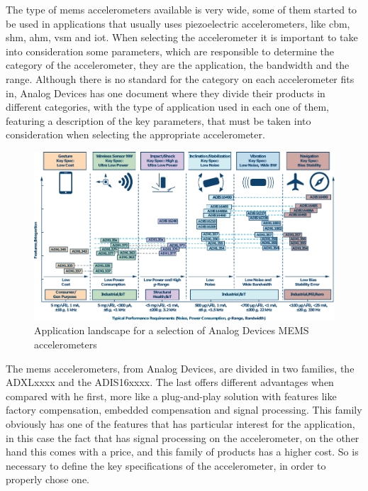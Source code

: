 The type of \acrshort{mems} accelerometers available is very wide, some of them started to be used in applications that usually uses piezoelectric accelerometers, like \acrshort{cbm}, \acrshort{shm}, \acrshort{ahm}, \acrshort{vsm} and \acrshort{iot}. When selecting the accelerometer it is important to take into consideration some parameters, which are responsible to determine the category of the accelerometer, they are the application, the bandwidth and the range. Although there is no standard for the category on each accelerometer fits in, Analog Devices has one document where they divide their products in different categories, with the type of application used in each one of them, featuring a description of the key parameters, that must be taken into consideration when selecting the appropriate accelerometer.
\begin{figure}[]
    \centering
    \includegraphics[width=1\textwidth]{Chapters/4CHP/Figures/adTable.pdf}
    \caption{Application landscape for a selection of Analog Devices MEMS accelerometers}
    \label{fig:adtable}
\end{figure}
The \acrshort{mems} accelerometers, from Analog Devices, are divided in two families, the ADXLxxxx and the ADIS16xxxx. The last offers different advantages when compared with he first, more like a plug-and-play solution with features like factory compensation, embedded compensation and signal processing. This family obviously has one of the features that has particular interest for the application, in this case the fact that has signal processing on the accelerometer, on the other hand this comes with a price, and this family of products has a higher cost. So is necessary to define the key specifications of the accelerometer, in order to properly chose one\cite{AnalogDialogue51102017}\cite{AnalogDialogue51112017}.

